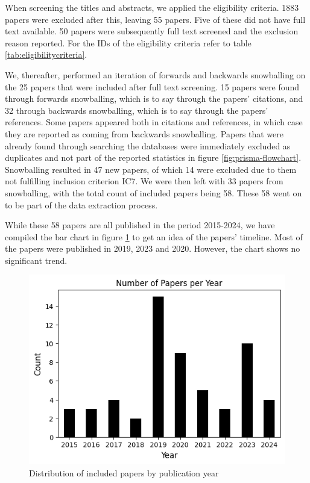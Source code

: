 When screening the titles and abstracts, we applied the eligibility criteria. 1883 papers were excluded after this, leaving 55 papers. Five of these did not have full text available. 50 papers were subsequently full text screened and the exclusion reason reported. For the IDs of the eligibility criteria refer to table \ref{tab:eligibilitycriteria}.

We, thereafter, performed an iteration of forwards and backwards snowballing on the 25 papers that were included after full text screening. 15 papers were found through forwards snowballing, which is to say through the papers' citations, and 32 through backwards snowballing, which is to say through the papers' references. Some papers appeared both in citations and references, in which case they are reported as coming from backwards snowballing. Papers that were already found through searching the databases were immediately excluded as duplicates and not part of the reported statistics in figure \ref{fig:prisma-flowchart}. Snowballing resulted in 47 new papers, of which 14 were excluded due to them not fulfilling inclusion criterion IC7. We were then left with 33 papers from snowballing, with the total count of included papers being 58. These 58 went on to be part of the data extraction process.

While these 58 papers are all published in the period 2015-2024, we have compiled the bar chart in figure \ref{fig:papersbyyear} to get an idea of the papers' timeline. Most of the papers were published in 2019, 2023 and 2020. However, the chart shows no significant trend.

\begin{figure}[h!]
    \centering
    \includegraphics[width=.8\linewidth]{figures/papers-by-year.png}
    \caption{Distribution of included papers by publication year}
    \label{fig:papersbyyear}
\end{figure}

